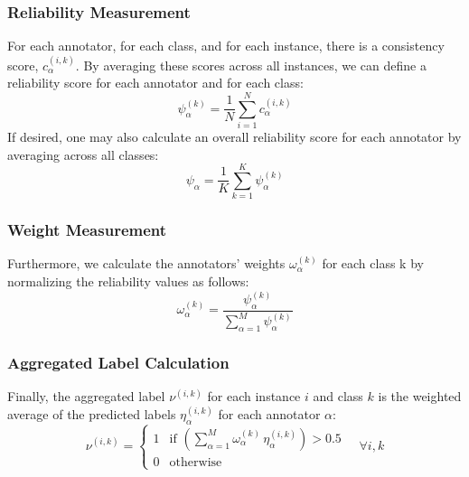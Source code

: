 \subsubsection{Reliability Measurement}
For each annotator, for each class, and for each instance, there is a consistency score, $c_{\alpha}^{(i,k)}$. By averaging these scores across all instances, we can define a reliability score for each annotator and for each class:
\begin{equation}
\psi_{\alpha}^{(k)}=\frac{1}{N}\sum_{i=1}^N c_{\alpha}^{(i,k)}\label{eq:crowd.reliability_measurement}
\end{equation}
If desired, one may also calculate an overall reliability score for each annotator by averaging across all classes:
\begin{equation}
\psi_{\alpha}=\frac{1}{K}\sum_{k=1}^K \psi_{\alpha}^{(k)}
\end{equation}

\subsubsection{Weight Measurement}
Furthermore, we calculate the annotators' weights $\omega_\alpha^{(k)}$ for each class k by normalizing the reliability values as follows:
\begin{equation}
    \omega_{\alpha}^{(k)}=\frac{\psi_{\alpha}^{(k)}}{\sum_{\alpha=1}^{M} \psi_{\alpha}^{(k)}}
    \label{eq:crowd.eq.11.weights}
\end{equation}

\subsubsection{Aggregated Label Calculation}
Finally, the aggregated label $\nu^{(i,k)}$ for each instance $i $ and class $k $ is the weighted average of the predicted labels $\eta_{\alpha}^{(i,k)} $ for each annotator $\alpha $:
\begin{equation}
    \nu^{(i,k)} =
    \begin{cases}
        1 & \text{if } \left(\sum_{\alpha=1}^{M} \omega_{\alpha}^{(k)}\, \eta_{\alpha}^{(i,k)}\right) > 0.5 \\
        0 & \text{otherwise}
    \end{cases}
    \quad \forall i, k
    \label{eq:crowd.Eq.12.aggregated-label}
\end{equation}

